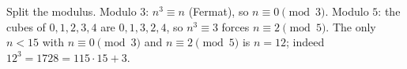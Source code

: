 Split the modulus. Modulo $3$: $n^3\equiv n$ (Fermat), so $n\equiv0\pmod3$. Modulo $5$: the cubes of $0,1,2,3,4$ are $0,1,3,2,4$, so $n^3\equiv3$ forces $n\equiv2\pmod5$. The only $n<15$ with $n\equiv0\pmod3$ and $n\equiv2\pmod5$ is $\boxed{n=12}$; indeed $12^3=1728=115\cdot15+3$.
